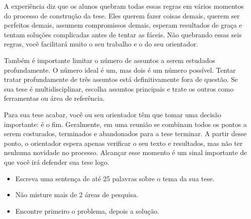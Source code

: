 A experiência diz que os alunos quebram todas essas regras em vários momentos do processo de construção da tese. Eles querem fazer coisas demais, querem ser perfeitos demais, assumem compromissos demais, esperam resultados de graça e tentam soluções complicadas antes de tentar as fáceis. Não quebrando essas seis regras, você facilitará muito o seu trabalho e o do seu orientador.

Também é importante limitar o número de assuntos a serem estudados profundamente. O número ideal é um, mas dois é um número possível. Tentar tratar profundamente de três assuntos está definitivamente fora de questão. Se sua tese é multidisciplinar, escolha assuntos principais e trate os outros como ferramentas ou área de referência.

Para sua tese acabar, você ou seu orientador têm que tomar uma decisão importante: é o fim. Geralmente, em uma reunião se combinam todos os pontos a serem costurados, terminados e abandonados para a tese terminar. A partir desse ponto, o orientador espera apenas verificar o seu texto e resultados, mas não ter nenhuma novidade no processo. Alcançar esse momento é um sinal importante de que você irá defender sua tese logo.

\begin{itemize}
    \item Escreva uma sentença de até 25 palavras sobre o tema da sua tese.
    \item Não misture mais de 2 áreas de pesquisa.
    \item Encontre primeiro o problema, depois a solução.
\end{itemize}
